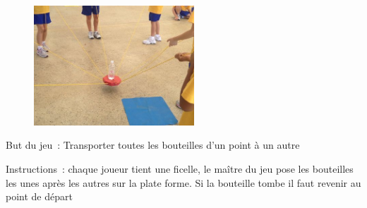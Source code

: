\documentclass{grand-jeu}
\begin{document}
\begin{liste-materiel}
\end{liste-materiel}

\begin{regles}
\begin{figure}
\vspace{-1cm}
\includegraphics[width=6cm]{4-Solidaire-rouge/sources/81.jpg}
\end{figure}

But du jeu : Transporter toutes les bouteilles d’un point à un autre

\vspace{0.2cm}

Instructions : chaque joueur tient une ficelle, le maître du jeu pose les bouteilles les unes après les autres sur la plate forme. Si la bouteille tombe il faut revenir au point de départ 
\end{regles}

\begin{imaginaire}

\end{imaginaire}

\begin{moments-stop}
\end{moments-stop}
\end{document}

